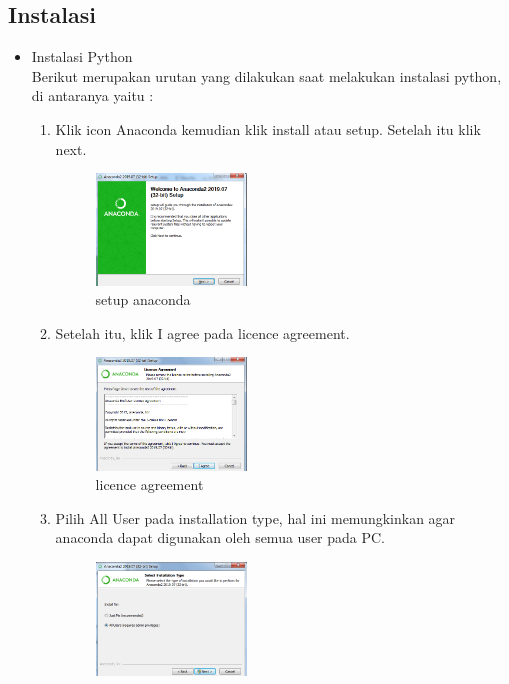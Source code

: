 \begin{enumerate}
\section{Instalasi}
\begin{itemize}
	\item Instalasi Python\\
	Berikut merupakan urutan yang dilakukan saat melakukan instalasi python, di antaranya yaitu :\\
	\begin{enumerate}
		\item Klik icon Anaconda kemudian klik install atau setup. Setelah itu klik next.
		\begin{figure}[H]
			\includegraphics[width=4cm]{figures/1184026/anaconda/anaconda1.png}
			\centering
			\caption{setup anaconda}
			\end{figure}
		\item Setelah itu, klik I agree pada licence agreement.\\
			\begin{figure}[H]
			\includegraphics[width=4cm]{figures/1184026/anaconda/anaconda2.png}
			\centering
			\caption{licence agreement}
			\end{figure}
		\item Pilih All User pada installation type, hal ini memungkinkan agar anaconda dapat digunakan oleh semua user pada PC.\\
			\begin{figure}[H]
			\includegraphics[width=4cm]{figures/1184026/anaconda/anaconda3.png}

\end{figure}
\end{enumerate}
\end{itemize}
\end{enumerate}
